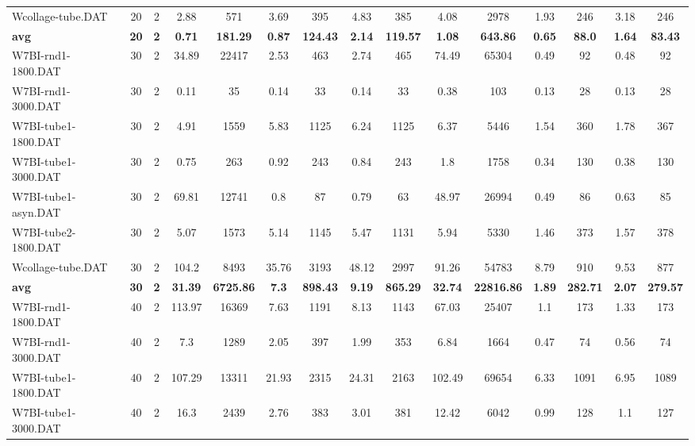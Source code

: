 \begin{table}[!ht]
{\begin{tabular}{lcccccccccccccc}
Wcollage-tube.DAT & 20 & 2 & 2.88 & 571 & 3.69 & 395 & 4.83 & 385 & 4.08 & 2978 &  \textcolor{blue2}{1.93} & 246 & 3.18 & 246 \\
\cline{1-15} \textbf{avg} & \textbf{20} & \textbf{2} & \textbf{0.71} & \textbf{181.29} & \textbf{0.87} & \textbf{124.43} & \textbf{2.14} & \textbf{119.57} & \textbf{1.08} & \textbf{643.86} & \textbf{0.65} & \textbf{88.0} & \textbf{1.64} & \textbf{83.43} \\ \cline{1-15}
W7BI-rnd1-1800.DAT & 30 & 2 & 34.89 & 22417 & 2.53 & 463 & 2.74 & 465 & 74.49 & 65304 & 0.49 & 92 &  \textcolor{blue2}{0.48} & 92 \\
W7BI-rnd1-3000.DAT & 30 & 2 &  \textcolor{blue2}{0.11} & 35 & 0.14 & 33 & 0.14 & 33 & 0.38 & 103 & 0.13 & 28 & 0.13 & 28 \\
W7BI-tube1-1800.DAT & 30 & 2 & 4.91 & 1559 & 5.83 & 1125 & 6.24 & 1125 & 6.37 & 5446 &  \textcolor{blue2}{1.54} & 360 & 1.78 & 367 \\
W7BI-tube1-3000.DAT & 30 & 2 & 0.75 & 263 & 0.92 & 243 & 0.84 & 243 & 1.8 & 1758 &  \textcolor{blue2}{0.34} & 130 & 0.38 & 130 \\
W7BI-tube1-asyn.DAT & 30 & 2 & 69.81 & 12741 & 0.8 & 87 & 0.79 & 63 & 48.97 & 26994 &  \textcolor{blue2}{0.49} & 86 & 0.63 & 85 \\
W7BI-tube2-1800.DAT & 30 & 2 & 5.07 & 1573 & 5.14 & 1145 & 5.47 & 1131 & 5.94 & 5330 &  \textcolor{blue2}{1.46} & 373 & 1.57 & 378 \\
Wcollage-tube.DAT & 30 & 2 & 104.2 & 8493 & 35.76 & 3193 & 48.12 & 2997 & 91.26 & 54783 &  \textcolor{blue2}{8.79} & 910 & 9.53 & 877 \\
\cline{1-15} \textbf{avg} & \textbf{30} & \textbf{2} & \textbf{31.39} & \textbf{6725.86} & \textbf{7.3} & \textbf{898.43} & \textbf{9.19} & \textbf{865.29} & \textbf{32.74} & \textbf{22816.86} & \textbf{1.89} & \textbf{282.71} & \textbf{2.07} & \textbf{279.57} \\ \cline{1-15}
W7BI-rnd1-1800.DAT & 40 & 2 & 113.97 & 16369 & 7.63 & 1191 & 8.13 & 1143 & 67.03 & 25407 &  \textcolor{blue2}{1.1} & 173 & 1.33 & 173 \\
W7BI-rnd1-3000.DAT & 40 & 2 & 7.3 & 1289 & 2.05 & 397 & 1.99 & 353 & 6.84 & 1664 &  \textcolor{blue2}{0.47} & 74 & 0.56 & 74 \\
W7BI-tube1-1800.DAT & 40 & 2 & 107.29 & 13311 & 21.93 & 2315 & 24.31 & 2163 & 102.49 & 69654 &  \textcolor{blue2}{6.33} & 1091 & 6.95 & 1089 \\
W7BI-tube1-3000.DAT & 40 & 2 & 16.3 & 2439 & 2.76 & 383 & 3.01 & 381 & 12.42 & 6042 &  \textcolor{blue2}{0.99} & 128 & 1.1 & 127 \\

\end{tabular}}
\end{table}

